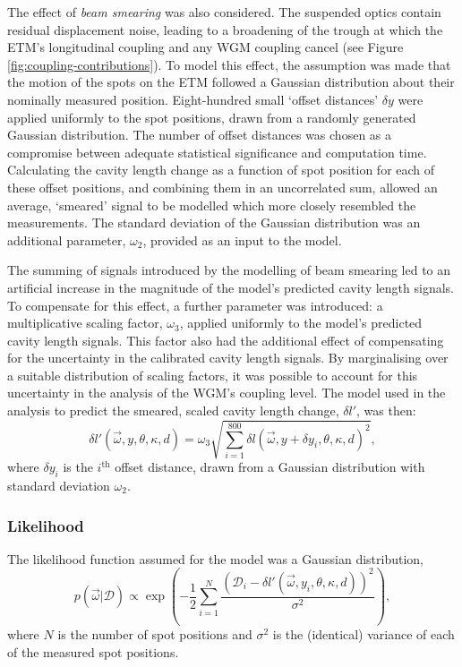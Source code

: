 The effect of \emph{beam smearing} was also considered. The suspended optics contain residual displacement noise, leading to a broadening of the trough at which the \gls{ETM}'s longitudinal coupling and any \gls{WGM} coupling cancel (see Figure\,\ref{fig:coupling-contributions}). To model this effect, the assumption was made that the motion of the spots on the \gls{ETM} followed a Gaussian distribution about their nominally measured position. Eight-hundred small `offset distances' $\delta y$ were applied uniformly to the spot positions, drawn from a randomly generated Gaussian distribution. The number of offset distances was chosen as a compromise between adequate statistical significance and computation time. Calculating the cavity length change as a function of spot position for each of these offset positions, and combining them in an uncorrelated sum, allowed an average, `smeared' signal to be modelled which more closely resembled the measurements. The standard deviation of the Gaussian distribution was an additional parameter, $\omega_2$, provided as an input to the model.

The summing of signals introduced by the modelling of beam smearing led to an artificial increase in the magnitude of the model's predicted cavity length signals. To compensate for this effect, a further parameter was introduced: a multiplicative scaling factor, $\omega_3$, applied uniformly to the model's predicted cavity length signals. This factor also had the additional effect of compensating for the uncertainty in the calibrated cavity length signals. By marginalising over a suitable distribution of scaling factors, it was possible to account for this uncertainty in the analysis of the \gls{WGM}'s coupling level. The model used in the analysis to predict the smeared, scaled cavity length change, $\delta l'$, was then:
\begin{equation}
  \delta l' \left( \vec{\omega}, y, \theta, \kappa, d \right) = \omega_3 \sqrt{\sum_{i=1}^{800} \delta l \left( \vec{\omega}, y + \delta y_i, \theta, \kappa, d \right)^2},
  \label{eq:model}
\end{equation}
where $\delta y_i$ is the $i^\text{th}$ offset distance, drawn from a Gaussian distribution with standard deviation $\omega_2$.

\subsubsection{Likelihood}
The likelihood function assumed for the model was a Gaussian distribution,
\begin{equation}
  p \left( \vec{\omega} | \mathcal{D} \right) \propto \exp \left( -\frac{1}{2} \sum_{i=1}^{N} \frac{\left( \mathcal{D}_i - \delta l' \left( \vec{\omega}, y_i, \theta, \kappa, d \right) \right)^2}{\sigma^2} \right),
  \label{eq:likelihood}
\end{equation}
where $N$ is the number of spot positions and $\sigma^2$ is the (identical) variance of each of the measured spot positions.

